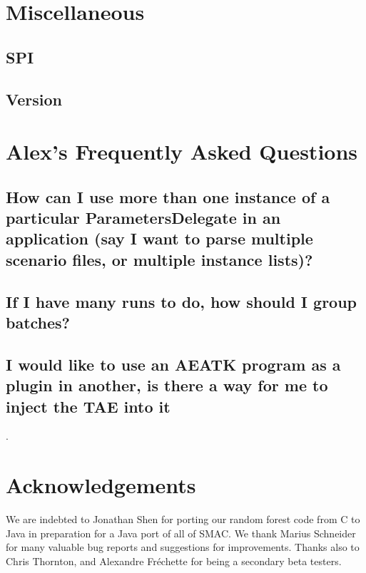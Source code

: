 \documentclass[11pt,letterpaper,oneside]{article}
\begin{document}
\section{Miscellaneous}


\subsection{SPI}
\label{sec:misc-spi}

\subsection{Version}
\label{sec:version}



\section{Alex's Frequently Asked Questions}

\subsection{How can I use more than one instance of a particular ParametersDelegate in an application (say I want to parse multiple scenario files, or multiple instance lists)?}

\subsection{If I have many runs to do, how should I group batches?}

\subsection{I would like to use an AEATK program as a plugin in another, is there a way for me to inject the TAE into it}.




\section{Acknowledgements}

We are indebted to Jonathan Shen for porting our random forest code from C to Java in preparation for a Java port of all of SMAC. We thank Marius Schneider for many valuable bug reports and suggestions for improvements. Thanks also to Chris Thornton, and Alexandre Fr\'echette for being a secondary beta testers.


\renewcommand{\bibsection}{\section{References}}


\end{document}
